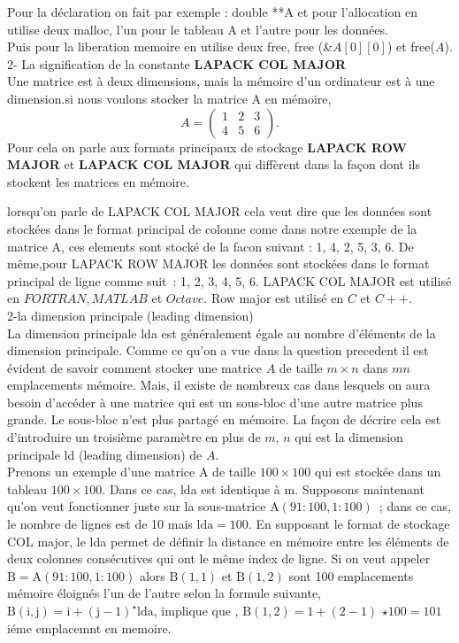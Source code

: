 \documentclass[12pt]{report}
\begin{document}
Pour la déclaration on fait par exemple : double **A et
pour l'allocation en utilise deux malloc, l'un pour le tableau A et l'autre pour les données.\\
Puis pour la liberation memoire en utilise deux free, free (\&$A[0][0]$) {et} free($A$).\\

2- La signification de la constante \textbf{LAPACK COL MAJOR}\\

Une matrice est à deux dimensions, mais la mémoire d'un ordinateur est à une dimension.si nous voulons stocker la matrice A en mémoire,
$$
A=\left(\begin{array}{lll}
1 & 2 & 3 \\
4 & 5 & 6
\end{array}\right) .
$$
Pour cela on parle aux formats principaux de stockage \textbf{ LAPACK ROW MAJOR} et \textbf{LAPACK COL MAJOR} qui diffèrent dans la façon dont ils stockent les matrices en mémoire.

lorsqu'on parle de LAPACK COL MAJOR cela veut dire que les données sont stockées dans le format principal de colonne come dans notre exemple de la matrice A, ces elements sont stocké de la facon suivant  : 1, 4, 2, 5, 3, 6. De même,pour LAPACK ROW MAJOR les données sont stockées dans le format principal de ligne comme suit : 1, 2, 3, 4, 5, 6.
LAPACK COL MAJOR est utilisé en $FORTRAN, MATLAB$ et $Octave$. Row major est utilisé en $C$ et $C++$.\\


2-la dimension principale (leading dimension)\\

La dimension principale lda est généralement égale au nombre d'éléments de la dimension principale.
Comme ce qu'on a vue dans la question precedent il est évident de savoir comment stocker une matrice $A$ de taille $m \times n$ dans $mn$ emplacements mémoire. Mais, il existe de nombreux cas dans lesquels on aura besoin d'accéder à une matrice qui est un sous-bloc d'une autre matrice plus grande. Le sous-bloc n'est plus partagé en mémoire. La façon de décrire cela est d'introduire un troisième paramètre en plus de $m$, $n$ qui est la dimension principale ld (leading dimension) de $A $.\\


Prenons un exemple d'une matrice A de taille $100\times 100$ qui est stockée dans un tableau $100\times 100$. Dans ce cas, lda est identique à $\mathrm{m}$. Supposons maintenant qu'on veut fonctionner juste sur la sous-matrice $\mathrm{A}(91 : 100,1 : 100)$ ; dans ce cas, le nombre de lignes est de 10 mais $\mathrm{lda}=100$. En supposant le format de stockage COL major, le lda permet de définir la distance en mémoire entre les éléments de deux colonnes consécutives qui ont le même index de ligne. 
Si on veut appeler $\mathrm{B}=\mathrm{A}(91:100,1:100)$ alors $\mathrm{B}(1,1)$ et $\mathrm{B}(1,2)$ sont 100 emplacements mémoire éloignés l'un de l'autre selon la formule suivante, 
$\mathrm{B}(\mathrm{i}, \mathrm{j})=\mathrm{i}+(\mathrm{j}-1)^{\star} \mathrm{lda}$, implique que , $\mathrm{B}(1,2)=1+(2-1)$ $\star 100=101$ iéme emplacemnt en memoire.\\
\end{document}
